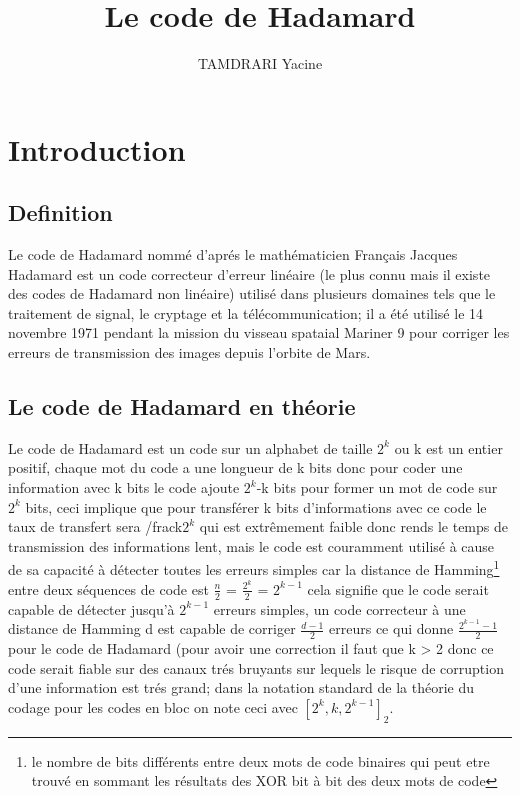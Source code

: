 \documentclass{article}
\author{TAMDRARI Yacine}
\title{Le code de Hadamard}
\begin{document}
\maketitle
\titlepage
\tableofcontents
\newpage

\section{Introduction}

\subsection{Definition}

Le code de Hadamard nommé d'aprés le mathématicien Français Jacques 
Hadamard est un code correcteur d'erreur linéaire (le plus connu mais il 
existe des codes de Hadamard non linéaire) utilisé dans plusieurs 
domaines tels que le traitement de signal, le cryptage et la 
télécommunication; il a été utilisé le 14 novembre 1971 pendant la mission
du visseau spataial Mariner 9 pour corriger les erreurs de transmission des
images depuis l'orbite de Mars.

\subsection{Le code de Hadamard en théorie}

Le code de Hadamard est un code sur un alphabet de taille $2^k$ ou k est un
entier positif, chaque mot du code a une longueur de k bits donc pour coder
une information avec k bits le code ajoute $2^k$-k bits pour former un mot
de code sur $2^k$ bits, ceci implique que pour transférer k bits 
d'informations avec ce code le taux de transfert sera /frac{k}{$2^k$} qui 
est extrêmement faible donc rends le temps de transmission des informations
lent, mais le code est couramment utilisé à cause de sa capacité à détecter
toutes les erreurs simples car la distance de Hamming\footnote{le nombre 
de bits différents entre deux mots de code binaires qui peut etre trouvé en
sommant les résultats des XOR bit à bit des deux mots de code} entre deux séquences de code est $\frac{n}{2}$ = $\frac{2^k}{2}$ = $2^{k-1}$ cela 
signifie que le code serait capable de détecter jusqu'à $2^{k-1}$ erreurs 
simples, un code correcteur à une distance de Hamming d est capable de 
corriger $\frac{d-1}{2}$ erreurs ce qui donne $\frac{2^{k-1}-1}{2}$ pour le
code de Hadamard (pour avoir une correction il faut que k > 2 donc ce code 
serait fiable sur des canaux trés bruyants sur lequels le risque de 
corruption d'une information est trés grand; dans la notation standard de 
la théorie du codage pour les codes en bloc on note ceci avec 
$[2^k, k, 2^{k-1}]_2$.
\end{document}
